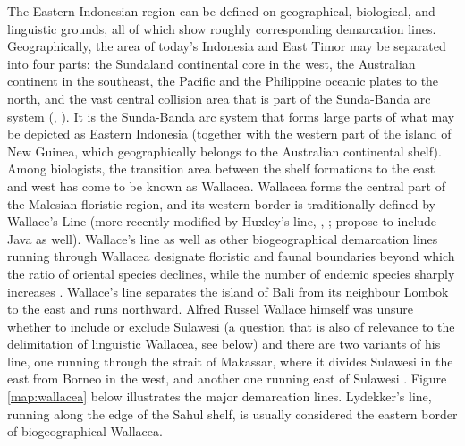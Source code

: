 The Eastern Indonesian region can be defined on geographical, biological, and linguistic grounds, all of which show roughly corresponding demarcation lines. Geographically, the area of today's Indonesia and East Timor may be separated into four parts: the Sundaland continental core in the west, the Australian continent in the southeast, the Pacific and the Philippine oceanic plates to the north, and the vast central collision area that is part of the Sunda-Banda arc system (\citealt{Bellwood2007}, \citealt{Hall2009}). It is the Sunda-Banda arc system that forms large parts of what may be depicted as Eastern Indonesia (together with the western part of the island of New Guinea, which geographically belongs to the Australian continental shelf). Among biologists, the transition area between the shelf formations to the east and west has come to be known as Wallacea. Wallacea forms the central part of the Malesian floristic region, and its western border is traditionally defined by Wallace's Line (more recently modified by Huxley's line, \citealt{Bellwood2007}, \citealt{Raes2009}; \citealt{Welzen2011} propose to include Java as well). Wallace's line as well as other biogeographical demarcation lines running through Wallacea designate floristic and faunal boundaries beyond which the ratio of oriental species declines, while the number of endemic species sharply increases \citep{Bellwood2007}. Wallace's line separates the island of Bali from its neighbour Lombok to the east and runs northward. Alfred Russel Wallace himself was unsure whether to include or exclude Sulawesi (a question that is also of relevance to the delimitation of linguistic Wallacea, see below) and there are two variants of his line, one running through the strait of Makassar, where it divides Sulawesi in the east from Borneo in the west, and another one running east of Sulawesi \citep{Welzen2011}. Figure \ref{map:wallacea} below illustrates the major demarcation lines. Lydekker's line, running along the edge of the Sahul shelf, is usually considered the eastern border of biogeographical Wallacea.

